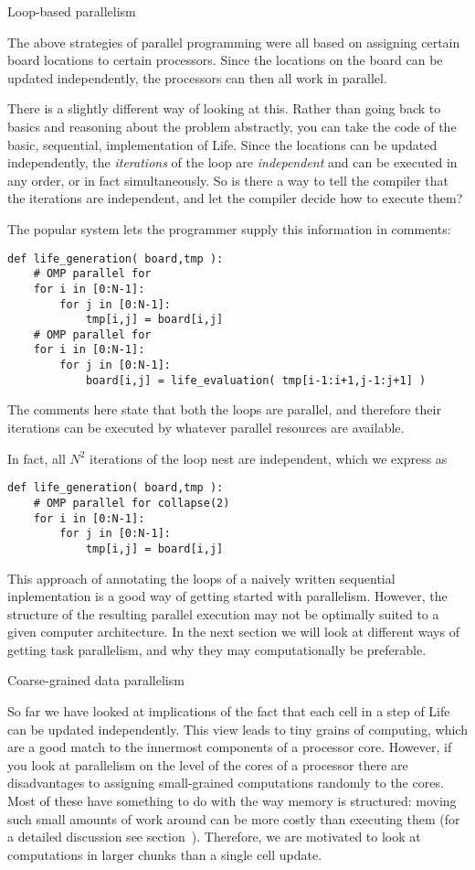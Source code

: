  {Loop-based parallelism}
\label{sec:omp}

The above strategies of parallel programming were all based on
assigning certain board locations to certain processors.
Since the locations on the board can be updated 
independently, the processors can then all work in parallel. 

There is a slightly different way of looking at this.  Rather than
going back to basics and reasoning about the problem abstractly, you
can take the code of the basic, sequential, implementation of Life.
%
Since the locations can be updated independently, the
\emph{iterations} of the loop are \emph{independent}
and can be executed in any order, or in fact simultaneously.
So is there a way to tell the compiler that the iterations
are independent, and let the compiler decide
how to execute them?

The popular  system lets the programmer
supply this information in comments:
\begin{verbatim}
def life_generation( board,tmp ):
    # OMP parallel for
    for i in [0:N-1]:
        for j in [0:N-1]:
            tmp[i,j] = board[i,j]
    # OMP parallel for
    for i in [0:N-1]:
        for j in [0:N-1]:
            board[i,j] = life_evaluation( tmp[i-1:i+1,j-1:j+1] )
\end{verbatim}
The comments here state that both
the  loops are parallel, and
therefore their iterations can be executed by whatever parallel resources are
available.

In fact, all $N^2$ iterations of the  loop nest are independent,
which we express as
\begin{verbatim}
def life_generation( board,tmp ):
    # OMP parallel for collapse(2)
    for i in [0:N-1]:
        for j in [0:N-1]:
            tmp[i,j] = board[i,j]
\end{verbatim}

This approach of annotating the loops of a naively written sequential 
inplementation is a good way of getting started with parallelism.
However, the structure of the resulting parallel execution may not be
optimally suited to a given computer architecture. In the next section
we will look at different ways of getting task parallelism,
and why they may computationally be preferable.

 {Coarse-grained data parallelism}

So far we have looked at implications of the fact that each cell in a
step of Life can be updated independently. This view leads to tiny grains
of computing, which are a good match to the innermost components of
a processor core. However, if you look at parallelism on the level
of the cores of a processor there are disadvantages to 
assigning small-grained computations randomly to the cores. 
Most of these have something to do with the way memory is structured:
moving such small amounts of work around can be more costly
than executing them
(for a detailed discussion see section~).
Therefore, we are motivated to look at computations in 
larger chunks than  a single cell
update. 

